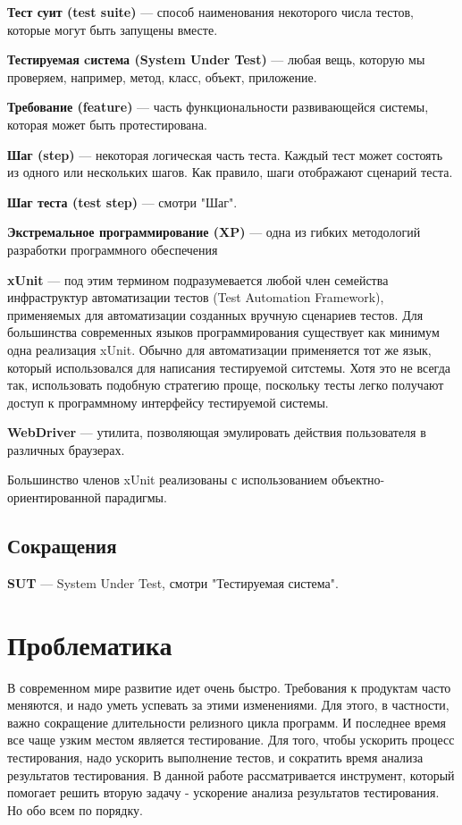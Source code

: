 {\bf Тест суит (test suite)} ---
способ наименования некоторого числа тестов, которые могут быть запущены вместе.

{\bf Тестируемая cистема (System Under Test)} ---
любая вещь, которую мы проверяем, например, метод, класс, объект, приложение.

{\bf Требование (feature)} ---
часть функциональности развивающейся системы, которая может быть протестирована.

{\bf Шаг (step)} ---
некоторая логическая часть теста. Каждый тест может состоять из одного или нескольких шагов. Как правило, шаги отображают сценарий теста.

{\bf Шаг теста (test step)} ---
смотри "Шаг".

{\bf Экстремальное программирование (XP)} ---
одна из гибких методологий разработки программного обеспечения

{\bf xUnit} ---
под этим термином подразумевается любой член семейства инфраструктур автоматизации тестов (Test Automation Framework), применяемых для автоматизации созданных вручную сценариев тестов. Для большинства современных языков программирования существует как минимум одна реализация xUnit. Обычно для автоматизации применяется тот же язык, который использовался для написания тестируемой ситстемы. Хотя это не всегда так, использовать подобную стратегию проще, поскольку тесты легко получают доступ к программному интерфейсу тестируемой системы.

{\bf WebDriver} ---
утилита, позволяющая эмулировать действия пользователя в различных браузерах.

Большинство членов xUnit реализованы с использованием объектно-ориентированной парадигмы.

\subsection{Сокращения}

{\bf SUT} --- System Under Test, смотри "Тестируемая система".

\section{Проблематика}

В современном мире развитие идет очень быстро. Требования к продуктам часто меняются, и надо уметь успевать за этими изменениями. Для этого, в частности, важно сокращение длительности релизного цикла программ. И последнее время все чаще узким местом является тестирование. Для того, чтобы ускорить процесс тестирования, надо ускорить выполнение тестов, и сократить время анализа результатов тестирования. В данной работе рассматривается инструмент, который помогает решить вторую задачу - ускорение анализа результатов тестирования. Но обо всем по порядку.

